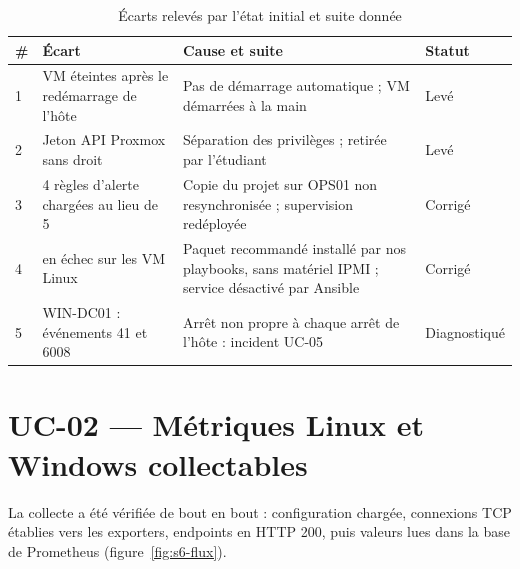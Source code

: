 \begin{table}[H]
\centering
\caption{Écarts relevés par l'état initial et suite donnée}\label{tab:s6-ecarts}
\begin{tabularx}{\linewidth}{@{}P{0.4cm}P{4.6cm}LP{1.6cm}@{}}
\toprule
\textbf{\#} & \textbf{Écart} & \textbf{Cause et suite} & \textbf{Statut} \\
 & VM éteintes après le redémarrage de l'hôte & Pas de démarrage automatique ; VM démarrées à la main & Levé \\
2 & Jeton API Proxmox sans droit & Séparation des privilèges ; retirée par l'étudiant & Levé \\
3 & 4 règles d'alerte chargées au lieu de 5 & Copie du projet sur OPS01 non resynchronisée ; supervision redéployée & Corrigé \\
4 &  en échec sur les VM Linux & Paquet recommandé installé par nos playbooks, sans matériel IPMI ; service désactivé par Ansible & Corrigé \\
5 & WIN-DC01 : événements 41 et 6008 & Arrêt non propre à chaque arrêt de l'hôte : incident UC-05 & Diagnostiqué \\
\bottomrule
\end{tabularx}
\end{table}


\section{UC-02 — Métriques Linux et Windows collectables}

La collecte a été vérifiée de bout en bout : configuration chargée, connexions TCP établies vers
les exporters, endpoints  en HTTP 200, puis valeurs lues dans la base de Prometheus
(figure~\ref{fig:s6-flux}).




